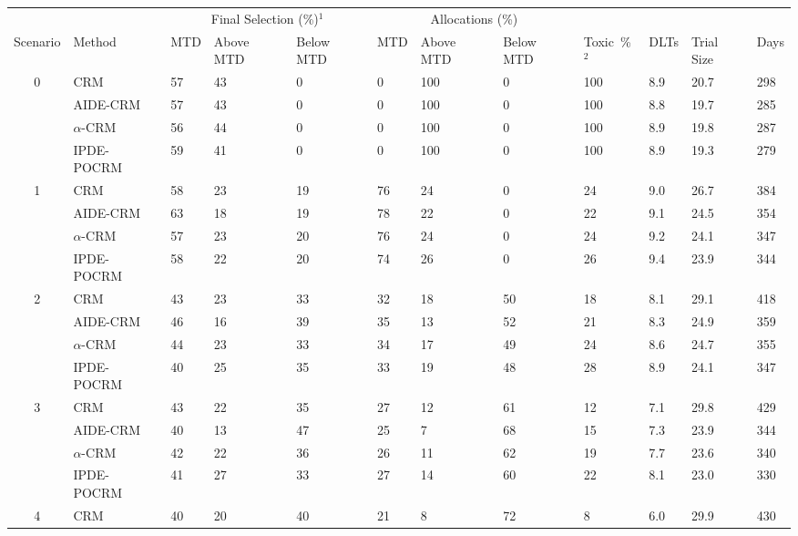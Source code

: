\begin{tabular*}{\textwidth}{@{\extracolsep\fill}clllllllllll@{\extracolsep\fill}}
\toprule
&  & \multicolumn{3}{c}{Final Selection (\%)$^1$} & \multicolumn{3}{c}{Allocations (\%)} & &  &  &  \\
\multirow{2}{2em}{Scenario} & \multirow{2}{2em}{Method} & \multirow{2}{2em}{MTD} & \multirow{2}{2em}{Above MTD} & \multirow{2}{2em}{Below MTD} & \multirow{2}{2em}{MTD} & \multirow{2}{2em}{Above MTD} & \multirow{2}{2em}{Below MTD} & \multirow{2}{2em}{Toxic~\%$^2$} & \multirow{2}{2em}{DLTs} & \multirow{2}{2em}{Trial Size} & \multirow{2}{2em}{Days}  \\ \\ 
\midrule
\multirow{4}{2em}{0} & CRM & 57 & 43 & 0 & 0 & 100 & 0 & 100 & 8.9 & 20.7 & 298\\
 & AIDE-CRM & 57 & 43 & 0 & 0 & 100 & 0 & 100 & 8.8 & 19.7 & 285\\
 & $\alpha$-CRM & 56 & 44 & 0 & 0 & 100 & 0 & 100 & 8.9 & 19.8 & 287\\
 & IPDE-POCRM & 59 & 41 & 0 & 0 & 100 & 0 & 100 & 8.9 & 19.3 & 279\\
\midrule
\multirow{4}{2em}{1} & CRM & 58 & 23 & 19 & 76 & 24 & 0 & 24 & 9.0 & 26.7 & 384\\
 & AIDE-CRM & 63 & 18 & 19 & 78 & 22 & 0 & 22 & 9.1 & 24.5 & 354\\
 & $\alpha$-CRM & 57 & 23 & 20 & 76 & 24 & 0 & 24 & 9.2 & 24.1 & 347\\
 & IPDE-POCRM & 58 & 22 & 20 & 74 & 26 & 0 & 26 & 9.4 & 23.9 & 344\\
\midrule
\multirow{4}{2em}{2} & CRM & 43 & 23 & 33 & 32 & 18 & 50 & 18 & 8.1 & 29.1 & 418\\
 & AIDE-CRM & 46 & 16 & 39 & 35 & 13 & 52 & 21 & 8.3 & 24.9 & 359\\
 & $\alpha$-CRM & 44 & 23 & 33 & 34 & 17 & 49 & 24 & 8.6 & 24.7 & 355\\
 & IPDE-POCRM & 40 & 25 & 35 & 33 & 19 & 48 & 28 & 8.9 & 24.1 & 347\\
\midrule
\multirow{4}{2em}{3} & CRM & 43 & 22 & 35 & 27 & 12 & 61 & 12 & 7.1 & 29.8 & 429\\
 & AIDE-CRM & 40 & 13 & 47 & 25 & 7 & 68 & 15 & 7.3 & 23.9 & 344\\
 & $\alpha$-CRM & 42 & 22 & 36 & 26 & 11 & 62 & 19 & 7.7 & 23.6 & 340\\
 & IPDE-POCRM & 41 & 27 & 33 & 27 & 14 & 60 & 22 & 8.1 & 23.0 & 330\\
\midrule
\multirow{4}{2em}{4} & CRM & 40 & 20 & 40 & 21 & 8 & 72 & 8 & 6.0 & 29.9 & 430\\

\end{tabular*}
